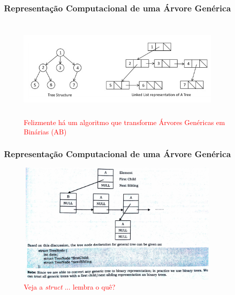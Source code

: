 
\begin{frame}

    \frametitle{Representação  Computacional de uma Árvore Genérica}
    
     \begin{figure}[!ht]
     \centering
    \includegraphics[width=10cm, height=5cm]{figs/fig_arvores/arv_generica03.jpg}
    \caption{\textcolor{red}{Felizmente há um algoritmo que transforme  Árvores Genéricas em Binárias (AB) }}
    \end{figure}

\end{frame}

\begin{frame}

    \frametitle{Representação  Computacional de uma Árvore Genérica}
    
     \begin{figure}[!ht]
     \centering
    \includegraphics[width=10cm, height=6cm]{figs/fig_arvores/arv_generica04.png}
   \caption{\textcolor{red}{Veja a \textit{struct} ... lembra o quê?}}
    \end{figure}

\end{frame}

